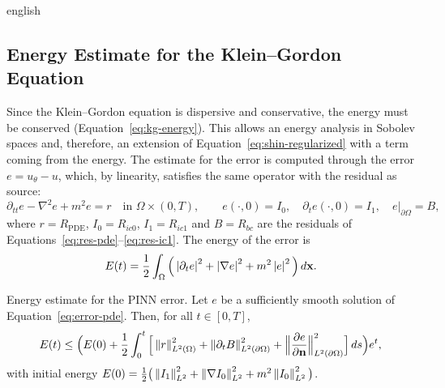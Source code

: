 \begin{hyphenrules}{english}
\subsection{Energy Estimate for the Klein--Gordon Equation}\label{subsec:energy-estimate}\label{sec:energy-estimate}

Since the Klein--Gordon equation is dispersive and conservative, the energy must be conserved
(Equation~\eqref{eq:kg-energy}). This allows an energy analysis in Sobolev spaces and, therefore, an extension
of Equation~\eqref{eq:shin-regularized} with a term coming from the energy. The estimate for the error is computed
through the error $e=u_\theta-u$, which, by linearity, satisfies the same operator with the residual as
source:
\begin{equation}
  \partial_{tt}e-\nabla^2e+m^2e=r\quad\text{in }\Omega\times(0,T),\qquad
  e(\cdot,0)=I_0,\quad\partial_te(\cdot,0)=I_1,\quad e|_{\partial\Omega}=B,
  \label{eq:error-pde}
\end{equation}
where $r=R_{\mathrm{PDE}}$, $I_0=R_{ic0}$, $I_1=R_{ic1}$ and $B=R_{bc}$ are the residuals of
Equations~\eqref{eq:res-pde}--\eqref{eq:res-ic1}. The energy of the error is
\begin{equation}
  E(t)=\frac12\int_\Omega\Big(\left\lvert \partial_te \right\rvert^2+\left\lvert \nabla e \right\rvert^2+m^2\left\lvert e \right\rvert^2\Big)\,d\mathbf{x}.
  \label{eq:error-energy}
\end{equation}

\begin{teorema}{Energy estimate for the PINN error.}\label{thm:energy-estimate}
Let $e$ be a sufficiently smooth solution of Equation~\eqref{eq:error-pde}. Then, for all $t\in[0,T]$,
\begin{equation}
  E(t)\le\Big(E(0)+\frac12\int_0^t\Big[\left\lVert r \right\rVert^2_{L^2(\Omega)}+\left\lVert \partial_tB \right\rVert^2_{L^2(\partial\Omega)}
  +\Big\|\frac{\partial e}{\partial\mathbf{n}}\Big\|^2_{L^2(\partial\Omega)}\Big]\,d s\Big)e^{t},
  \label{eq:energy-bound}
\end{equation}
with initial energy
$E(0)=\frac12\big(\left\lVert I_1 \right\rVert^2_{L^2}+\left\lVert \nabla I_0 \right\rVert^2_{L^2}+m^2\left\lVert I_0 \right\rVert^2_{L^2}\big)$.
\end{teorema}


\end{hyphenrules}
